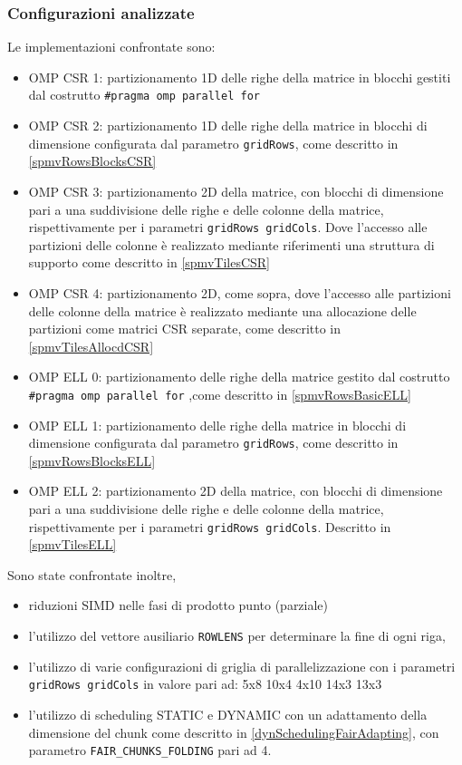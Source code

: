 \documentclass[acmsmall,nonacm=true]{acmart}
\newcommand{\vvv}[1]{{\small\texttt{#1}}}
\begin{document}
\subsubsection{Configurazioni analizzate}
Le implementazioni confrontate sono:
\begin{itemize}
 \item OMP CSR 1:	partizionamento 1D delle righe della matrice in blocchi
	gestiti dal costrutto \vvv{\#pragma omp parallel for}
 \item OMP CSR 2:
	partizionamento 1D delle righe della matrice in blocchi di dimensione
	configurata dal parametro \vvv{gridRows}, come descritto in \ref{spmvRowsBlocksCSR}
 \item OMP CSR 3:
	partizionamento 2D della matrice, con blocchi di dimensione pari
	a una suddivisione delle righe e delle colonne della matrice, rispettivamente per 
	i parametri \vvv{gridRows gridCols}.
	Dove l'accesso alle partizioni delle colonne è realizzato mediante 
	riferimenti una struttura di supporto come descritto in \ref{spmvTilesCSR}
 \item OMP CSR 4:
	partizionamento 2D, come sopra, dove l'accesso alle partizioni
	delle colonne della matrice è realizzato mediante una allocazione delle partizioni
	come matrici CSR separate, come descritto in \ref{spmvTilesAllocdCSR}
 
 \item OMP ELL 0: 
	partizionamento delle righe della matrice gestito dal costrutto \vvv{\#pragma omp parallel for}
	,come descritto in \ref{spmvRowsBasicELL}
 \item OMP ELL 1:
	partizionamento delle righe della matrice in blocchi di dimensione configurata dal parametro
	\vvv{gridRows}, come descritto in \ref{spmvRowsBlocksELL}
 \item OMP ELL 2:
	partizionamento 2D della matrice, con blocchi di dimensione pari
	a una suddivisione delle righe e delle colonne della matrice, rispettivamente per 
	i parametri \vvv{gridRows gridCols}. Descritto in \ref{spmvTilesELL}
\end{itemize}

Sono state confrontate inoltre, 
\begin{itemize}
 \item riduzioni SIMD nelle fasi di prodotto punto (parziale)\\
 \item l'utilizzo del vettore ausiliario \vvv{ROWLENS} per determinare la fine di ogni riga,\\
 \item 
	l'utilizzo di varie configurazioni di griglia di parallelizzazione con i parametri
	\vvv{gridRows gridCols} in valore pari ad:
		5x8
		10x4
		4x10
		14x3
		13x3
 \item l'utilizzo di scheduling STATIC e DYNAMIC con un adattamento della dimensione del chunk
  come descritto in \ref{dynSchedulingFairAdapting}, con parametro \vvv{FAIR\_CHUNKS\_FOLDING} pari ad 4.\\
\end{itemize}
\end{document}
